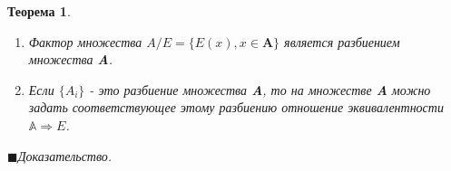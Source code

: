 \documentclass[12pt, a4paper, oneside]{article}
\theoremstyle{plain} %
\newtheorem{theorem}{Теорема}[section]
\theoremstyle{definition}
\begin{document}
\begin{theorem}

\begin{enumerate}
    
    \item Фактор множества $A/E = \{E(x), x \in \textbf{A}\}$ является разбиением множества \textbf{A}.
    
    \item Если $\{A_i\}$ - это разбиение множества \textbf{A}, то на множестве \textbf{A} можно задать соответствующее этому разбиению отношение эквивалентности $\mathbb{A} \Rightarrow E$.

\end{enumerate}

\end{theorem}

$\blacksquare$\textit{Доказательство.}
\end{document}
